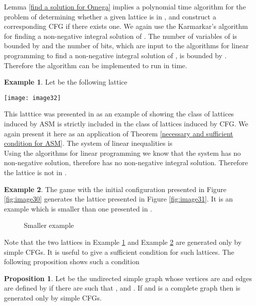 \documentclass{article}
\theoremstyle{definition}
\newtheorem{examp}{Example}
\newtheorem{prop}{Proposition}
\begin{document}
Lemma \ref{find a solution for Omega} implies a polynomial time algorithm for the problem of determining whether a given lattice is in , and construct a corresponding CFG if there exists one. We again use the Karmarkar's algorithm for finding a non-negative integral solution of . The number of variables of  is bounded by  and the number of bits, which are input to the algorithms for linear programming to find a non-negative integral solution of , is bounded by . Therefore the algorithm can be implemented to run in  time.\\
\begin{examp}
\label{old example}
Let  be the following lattice
\begin{center}
\texttt{[image: image32]}
\end{center}
This latttice was presented in \cite{Mag03} as an example of showing the class of lattices induced by ASM is strictly included in the class of lattices induced by CFG. We again present it here as an application of Theorem \ref{necessary and sufficient condition for ASM}.  The system  of linear inequalities is
\\
Using the algorithms for linear programming we know that the system has no non-negative  solution, therefore has no non-negative integral solution. Therefore the lattice is not in .
\end{examp}
\begin{examp}
\label{smaller example}
The game with the initial configuration presented in Figure \ref{fig:image30} generates the lattice presented in Figure \ref{fig:image31}. It is an example which is smaller than one presented in \cite{Mag03}. 
\begin{figure}[h]
\centering
{}
\qquad \qquad
{}
\caption{Smaller example}
\label{fig:image3031}
\end{figure}
\end{examp}
Note that the two lattices in Example \ref{old example} and Example \ref{smaller example} are generated only by simple CFGs. It is useful to give a sufficient condition for such lattices. The following proposition shows such a condition
\begin{prop} 
Let  be the undirected simple graph whose vertices are  and edges are defined by  if there are  such that ,  and . If  and  is a complete graph then  is generated only by simple CFGs.
\end{prop}
\end{document}
